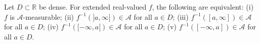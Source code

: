Let $D \subset \mathbb{R}$ be dense. For extended real-valued $f$, the following are equivalent:
(i) $f$ is $\mathcal{A}$-measurable;
(ii) $f^{-1}(]a, \infty]) \in \mathcal{A}$ for all $a \in D$;
(iii) $f^{-1}([a, \infty]) \in \mathcal{A}$ for all $a \in D$;
(iv) $f^{-1}([-\infty, a[) \in \mathcal{A}$ for all $a \in D$;
(v) $f^{-1}([-\infty, a]) \in \mathcal{A}$ for all $a \in D$.